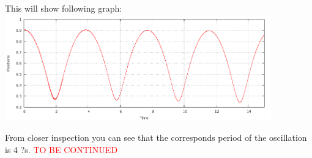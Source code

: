 \documentclass[10pt]{beamer}
\begin{document}


\begin{frame}
This will show following graph:\\

\centering
 \includegraphics[width=11.5cm]{fig/period}

From closer inspection you can see that the corresponds period of the oscillation is 4 ?s. \textcolor{red}{TO BE CONTINUED}

\end{frame}



\end{document}

